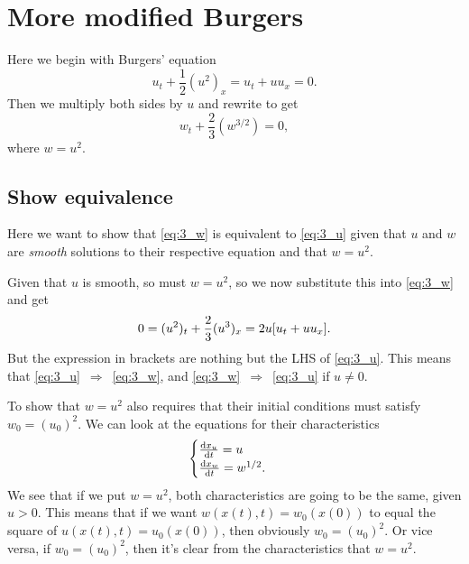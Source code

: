 \documentclass[11pt,letter, swedish, english
]{article}
\renewcommand{\thesubsection}{\arabic{section} (\alph{subsection})}
\begin{document}
\section{More modified Burgers}
\renewcommand{\thesubsection}{\arabic{section} (\alph{subsection})}
Here we begin with Burgers' equation
\begin{equation}\label{eq:3_u}
u_t + \frac{1}{2}(u^2)_x = u_t + uu_x = 0.
\end{equation}
Then we multiply both sides by $u$ and rewrite to get
\begin{equation}\label{eq:3_w}
w_t + \frac{2}{3} (w^{3/2}) = 0,
\end{equation}
where $w=u^2$.

\subsection{Show equivalence}
Here we want to show that \eqref{eq:3_w} is equivalent to
\eqref{eq:3_u} given that $u$ and $w$ are \emph{smooth} solutions to
their respective equation and that $w=u^2$.

Given that $u$ is smooth, so must $w=u^2$, so we now substitute this
into \eqref{eq:3_w} and get
\begin{equation}
0 = (u^2)_t + \frac{2}{3} (u^{3})_x = 2u \qty[u_t+uu_x].
\end{equation}
But the expression in brackets are nothing but the LHS of
\eqref{eq:3_u}. This means that
\eqref{eq:3_u}~$\Rightarrow$~\eqref{eq:3_w}, and
\eqref{eq:3_w}~$\Rightarrow$~\eqref{eq:3_u} if $u\neq0$.

To show that $w=u^2$ also requires that their initial conditions must
satisfy $w_0=(u_0)^2$. We can look at the equations for their
characteristics
\begin{equation}
\begin{cases}
\dv{x_u}{t} = u \\
\dv{x_w}{t} = w^{1/2}.
\end{cases}
\end{equation}
We see that if we put $w=u^2$, both characteristics are going to be
the same, given $u>0$. This means that if we want $w(x(t),t) =
w_0(x(0))$ to equal the square of $u(x(t),t) = u_0(x(0))$, then
obviously $w_0 = (u_0)^2$. Or vice versa, if $w_0 = (u_0)^2$, then
it's clear from the characteristics that $w=u^2$.\footnotemark{}

\end{document}
